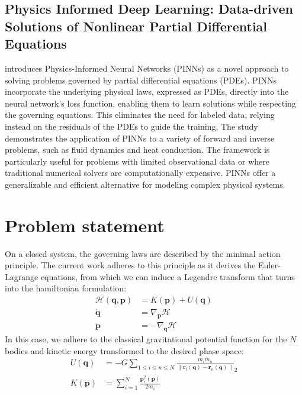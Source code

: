 \documentclass[draft]{agujournal2019}
\newcommand{\norm}[1]{\left\lVert#1\right\rVert}
\begin{document}
\subsection{Physics Informed Deep Learning: Data-driven Solutions of Nonlinear Partial Differential Equations}
\cite{raissi2017physicsinformeddeeplearning} introduces Physics-Informed Neural Networks (PINNs) as a novel approach to solving problems governed by partial differential equations (PDEs). PINNs incorporate the underlying physical laws, expressed as PDEs, directly into the neural network's loss function, enabling them to learn solutions while respecting the governing equations. This eliminates the need for labeled data, relying instead on the residuals of the PDEs to guide the training. The study demonstrates the application of PINNs to a variety of forward and inverse problems, such as fluid dynamics and heat conduction. The framework is particularly useful for problems with limited observational data or where traditional numerical solvers are computationally expensive. PINNs offer a generalizable and efficient alternative for modeling complex physical systems.

\section{Problem statement}
On a closed system, the governing laws are described by the minimal action principle. The current work adheres to this principle as it derives the Euler-Lagrange equations, from which we can induce a Legendre transform that turns into the hamiltonian formulation:
\begin{align}
    \mathcal{H}\left(\mathbf{q}, \mathbf{p}\right) &= K\left(\mathbf{p}\right)+ U\left(\mathbf{q}\right) \\
    \dot{\mathbf{q}} &= \nabla_\mathbf{p} \mathcal{H} \\
    \dot{\mathbf{p}} &= - \nabla_\mathbf{q} \mathcal{H}
\end{align}
In this case, we adhere to the classical gravitational potential function for the $N$ bodies and kinetic energy transformed to the desired phase space:
\begin{align*}
    U(\mathbf{q}) &= - G \sum_{1 \leq i \leq n \leq N} \frac{m_i m_n}{\norm{\mathbf{r}_i\left(\mathbf{q}\right) - \mathbf{r}_n\left(\mathbf{q}\right)}}_2 \\
    K(\mathbf{p}) &= \sum_{i = 1}^{N} \frac{\mathbf{p}_i^2\left(\mathbf{p}\right)}{2 m_i}
\end{align*}
\end{document}
